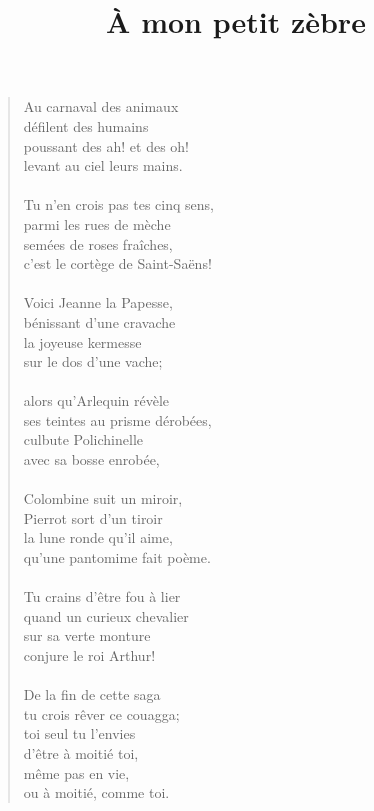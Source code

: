 \documentclass[twocolumn,11pt,a4paper]{article}
\title{À mon petit zèbre}
\author{}
\date{}
\begin{document}
\maketitle

\begin{verse}%
Au carnaval des animaux\\
défilent des humains\\
poussant des ah! et des oh!\\
levant au ciel leurs mains.\\
\ \\

Tu n'en crois pas tes cinq sens,\\
parmi les rues de mèche\\
semées de roses fraîches,\\
c'est le cortège de Saint-Saëns!\\
\ \\

Voici Jeanne la Papesse,\\
bénissant d'une cravache\\
la joyeuse kermesse\\
sur le dos d'une vache;\\
\ \\

alors qu'Arlequin révèle\\
ses teintes au prisme dérobées,\\
culbute Polichinelle\\
avec sa bosse enrobée,\\
\ \\

Colombine suit un miroir,\\
Pierrot sort d'un tiroir\\
la lune ronde qu'il aime,\\
qu'une pantomime fait poème.\\
\ \\

Tu crains d'être fou à lier\\
quand un curieux chevalier\\
sur sa verte monture\\
conjure le roi Arthur!\\
\ \\

De la fin de cette saga\\
tu crois rêver ce couagga;\\
toi seul tu l'envies\\
d'être à moitié toi,\\
même pas en vie,\\
ou à moitié, comme toi.\\


\end{verse}
\end{document}
